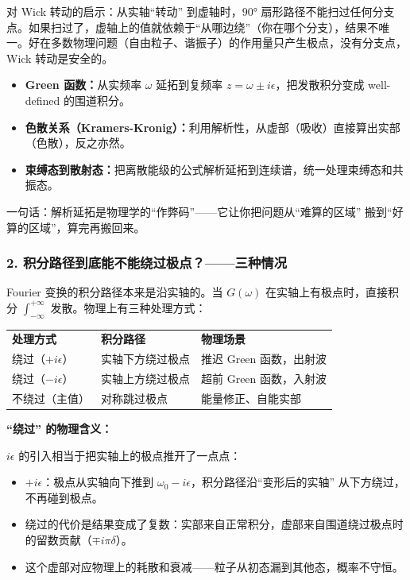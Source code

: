\begin{derivationbox}[解析延拓与积分路径的选择]
对 Wick 转动的启示：从实轴``转动'' 到虚轴时，$90°$ 扇形路径不能扫过任何分支点。如果扫过了，虚轴上的值就依赖于``从哪边绕''（你在哪个分支），结果不唯一。好在多数物理问题（自由粒子、谐振子）的作用量只产生极点，没有分支点，Wick 转动是安全的。

\begin{itemize}
    \item \textbf{Green 函数：}从实频率 $\omega$ 延拓到复频率 $z = \omega \pm i\epsilon$，把发散积分变成 well-defined 的围道积分。
    \item \textbf{色散关系（Kramers-Kronig）：}利用解析性，从虚部（吸收）直接算出实部（色散），反之亦然。
    \item \textbf{束缚态到散射态：}把离散能级的公式解析延拓到连续谱，统一处理束缚态和共振态。
\end{itemize}

一句话：解析延拓是物理学的``作弊码''——它让你把问题从``难算的区域'' 搬到``好算的区域''，算完再搬回来。

\subsubsection*{2. 积分路径到底能不能绕过极点？——三种情况}

Fourier 变换的积分路径本来是沿实轴的。当 $G(\omega)$ 在实轴上有极点时，直接积分 $\int_{-\infty}^{+\infty}$ 发散。物理上有三种处理方式：

\begin{tabular}{lll}
\textbf{处理方式} & \textbf{积分路径} & \textbf{物理场景} \\
绕过（$+i\epsilon$） & 实轴下方绕过极点 & 推迟 Green 函数，出射波 \\
绕过（$-i\epsilon$） & 实轴上方绕过极点 & 超前 Green 函数，入射波 \\
不绕过（主值） & 对称跳过极点 & 能量修正、自能实部 \\
\end{tabular}

\textbf{``绕过'' 的物理含义：}

$i\epsilon$ 的引入相当于把实轴上的极点推开了一点点：
\begin{itemize}
    \item $+i\epsilon$：极点从实轴向下推到 $\omega_0 - i\epsilon$，积分路径沿``变形后的实轴'' 从下方绕过，不再碰到极点。
    \item 绕过的代价是结果变成了复数：实部来自正常积分，虚部来自围道绕过极点时的留数贡献（$\mp i\pi\delta$）。
    \item 这个虚部对应物理上的耗散和衰减——粒子从初态漏到其他态，概率不守恒。
\end{itemize}


\end{derivationbox}
